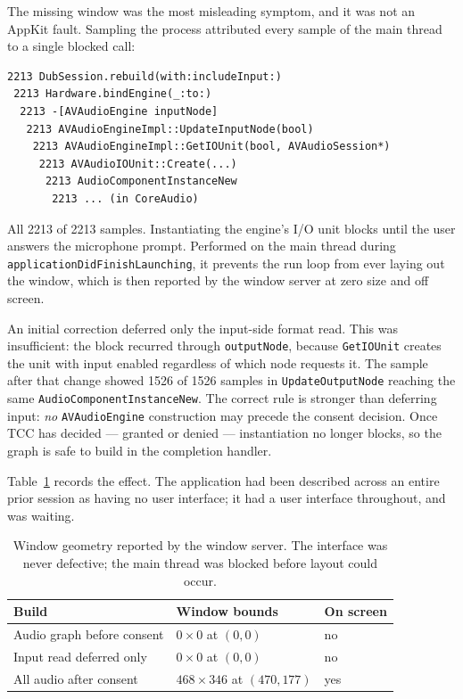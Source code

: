 \documentclass[10pt,letterpaper,twocolumn]{article}
\newcommand{\code}[1]{\texttt{#1}}
\begin{document}
The missing window was the most misleading symptom, and it was not an AppKit fault. Sampling the process attributed every sample of the main thread to a single blocked call:

\begin{lstlisting}
2213 DubSession.rebuild(with:includeInput:)
 2213 Hardware.bindEngine(_:to:)
  2213 -[AVAudioEngine inputNode]
   2213 AVAudioEngineImpl::UpdateInputNode(bool)
    2213 AVAudioEngineImpl::GetIOUnit(bool, AVAudioSession*)
     2213 AVAudioIOUnit::Create(...)
      2213 AudioComponentInstanceNew
       2213 ... (in CoreAudio)
\end{lstlisting}

All 2213 of 2213 samples. Instantiating the engine's I/O unit blocks until the user answers the microphone prompt. Performed on the main thread during \code{application\allowbreak DidFinish\allowbreak Launching}, it prevents the run loop from ever laying out the window, which is then reported by the window server at zero size and off screen.

An initial correction deferred only the input-side format read. This was insufficient: the block recurred through \code{outputNode}, because \code{GetIOUnit} creates the unit with input enabled regardless of which node requests it. The sample after that change showed 1526 of 1526 samples in \code{UpdateOutputNode} reaching the same \code{AudioComponent\allowbreak Instance\allowbreak New}. The correct rule is stronger than deferring input: \emph{no} \code{AVAudioEngine} construction may precede the consent decision. Once TCC has decided --- granted or denied --- instantiation no longer blocks, so the graph is safe to build in the completion handler.

Table~\ref{tab:window} records the effect. The application had been described across an entire prior session as having no user interface; it had a user interface throughout, and was waiting.

\begin{table}[t]
\centering
\small
\begin{tabular}{@{}lll@{}}
\toprule
\textbf{Build} & \textbf{Window bounds} & \textbf{On screen} \\
\midrule
Audio graph before consent & $0\times0$ at $(0,0)$ & no \\
Input read deferred only & $0\times0$ at $(0,0)$ & no \\
All audio after consent & $468\times346$ at $(470,177)$ & yes \\
\bottomrule
\end{tabular}
\caption{Window geometry reported by the window server. The interface was never defective; the main thread was blocked before layout could occur.}
\label{tab:window}
\end{table}
\end{document}
